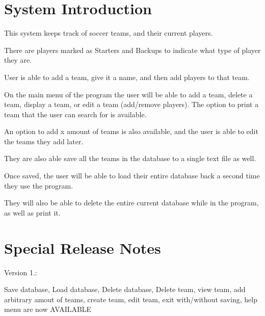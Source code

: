 \hypertarget{index_intro}{}\section{System Introduction}\label{index_intro}

\begin{DoxyItemize}
\item This system keeps track of soccer teams, and their current players.
\item There are players marked as Starters and Backups to indicate what type of player they are.
\item User is able to add a team, give it a name, and then add players to that team.
\item On the main menu of the program the user will be able to add a team, delete a team, display a team, or edit a team (add/remove players). The option to print a team that the user can search for is available.
\item An option to add x amount of teams is also available, and the user is able to edit the teams they add later.
\item They are also able save all the teams in the database to a single text file as well.
\item Once saved, the user will be able to load their entire database back a second time they use the program.
\item They will also be able to delete the entire current database while in the program, as well as print it.
\end{DoxyItemize}



 \hypertarget{index_notes}{}\section{Special Release Notes}\label{index_notes}

\begin{DoxyItemize}
\item Version 1.\-:
\begin{DoxyItemize}
\item Save database, Load database, Delete database, Delete team, view team, add arbitrary amout of teams, create team, edit team, exit with/without saving, help menu are now A\-V\-A\-I\-L\-A\-B\-L\-E
\end{DoxyItemize}
\end{DoxyItemize}



